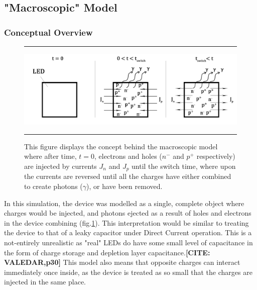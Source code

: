 \documentclass[titlepage]{article}
\begin{document}
\subsection{"Macroscopic" Model}
\subsubsection{Conceptual Overview}
\begin{figure}[t]
	\hrule
	\centering
	\includegraphics[scale=0.12]{Figures/Bucket_overview}
	\caption{\label{fig:bucketOverview}This figure displays the concept behind the macroscopic model where after time, $t=0$, electrons and holes ($n^-$ and $p^+$ respectively) are injected by currents $J_n$ and $J_p$ until the switch time, where upon the currents are reversed until all the charges have either combined to create photons ($\gamma$), or have been removed.}
	\hrule
\end{figure}
In this simulation, the device was modelled as a single, complete object where charges would be injected, and photons ejected as a result of holes and electrons in the device combining (fig.\ref{fig:bucketOverview}). This interpretation would be similar to treating the device to that of a leaky capacitor under Direct Current operation. This is a not-entirely unrealistic as "real" LEDs do have some small level of capacitance in the form of charge storage and  depletion layer capacitance.\textbf{[CITE: VALEDAR,p30]} This model also means that opposite charges can interact immediately once inside, as the device is treated as so small that the charges are injected in the same place.\\
\end{document}
